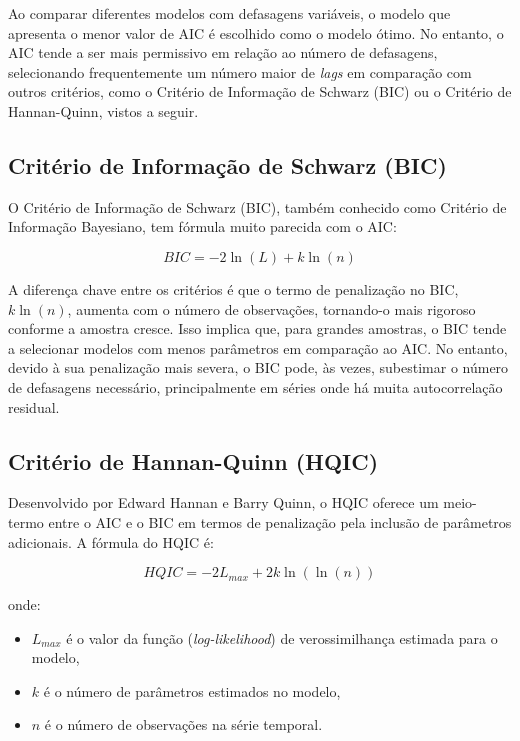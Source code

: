 \documentclass[12pt,oneside,a4paper,chapter=TITLE,english,brazil,sumario=abnt-6027-2012]{abntex2}
\begin{document}
Ao comparar diferentes modelos com defasagens variáveis, o modelo que apresenta o menor valor de AIC é escolhido como o modelo ótimo. No entanto, o AIC tende a ser mais permissivo em relação ao número de defasagens, selecionando frequentemente um número maior de \textit{lags} em comparação com outros critérios, como o Critério de Informação de Schwarz (BIC) ou o Critério de Hannan-Quinn, vistos a seguir.

\subsection{Critério de Informação de Schwarz (BIC)}

O Critério de Informação de Schwarz (BIC), também conhecido como Critério de Informação Bayesiano, tem fórmula muito parecida com o AIC:

\begin{equation}
	BIC = -2 \ln(L) + k \ln(n)
\end{equation}

A diferença chave entre os critérios é que o termo de penalização no BIC, \( k \ln(n) \), aumenta com o número de observações, tornando-o mais rigoroso conforme a amostra cresce. Isso implica que, para grandes amostras, o BIC tende a selecionar modelos com menos parâmetros em comparação ao AIC. No entanto, devido à sua penalização mais severa, o BIC pode, às vezes, subestimar o número de defasagens necessário, principalmente em séries onde há muita autocorrelação residual.

\subsection{Critério de Hannan-Quinn (HQIC)}

Desenvolvido por Edward Hannan e Barry Quinn, o HQIC oferece um meio-termo entre o AIC e o BIC em termos de penalização pela inclusão de parâmetros adicionais. A fórmula do HQIC é:

\begin{equation}
	\label{eqn:hannanquinn}
	HQIC = -2 L_{max} + 2k \ln(\ln(n))
\end{equation}

onde:

\begin{itemize}
	\item \( L_{max} \) é o valor da função (\textit{log-likelihood}) de verossimilhança estimada para o modelo,
	\item \( k \) é o número de parâmetros estimados no modelo,
	\item \( n \) é o número de observações na série temporal.
\end{itemize}
\end{document}
